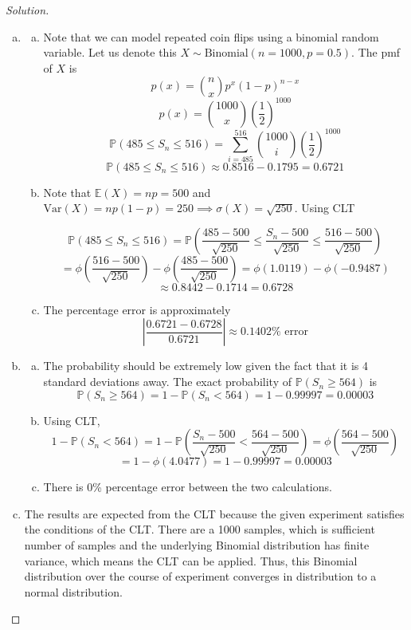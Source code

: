 \documentclass[12pt]{scrartcl}
\newcommand{\E}{\mathbb{E}}
\newcommand{\PP}{\mathbb{P}}
\newcommand{\V}{\text{Var}}
\begin{document}
\begin{proof}[Solution]
  
\hfill

\begin{enumerate}[a.]
  \item \begin{enumerate}[a.]

    \item Note that we can model repeated coin flips using a binomial random variable. Let 
    us denote this $X \sim \text{Binomial}(n=1000, p=0.5)$. The pmf of $X$ is 
    \[p(x) = \binom{n}{x}p^x(1-p)^{n-x}\]
    \[p(x) = \binom{1000}{x}(\frac{1}{2})^{1000}\]
    \[\PP(485 \leq S_n \leq 516) = \sum_{i=485}^{516} \binom{1000}{i}(\frac{1}{2})^{1000}\]
    \[\PP(485 \leq S_n \leq 516) \approx 0.8516 - 0.1795 = 0.6721\]

    \item Note that $\E(X) = np = 500$ and $\V(X) = np(1-p) = 250 \implies \sigma(X) = \sqrt{250}$. Using CLT
    
    \[\PP(485 \leq S_n \leq 516) = \PP(\frac{485 - 500}{\sqrt{250}} \leq \frac{S_n - 500}{\sqrt{250}} \leq \frac{516 - 500}{\sqrt{250}})\]
    \[= \phi(\frac{516 - 500}{\sqrt{250}}) - \phi(\frac{485 - 500}{\sqrt{250}}) = \phi(1.0119) - \phi(-0.9487)\]
    \[\approx 0.8442 - 0.1714 = 0.6728\]

    \item The percentage error is approximately 
    \[|\frac{0.6721 - 0.6728}{0.6721}| \approx 0.1402\% \text{ error}\]

  \end{enumerate}

  \item \begin{enumerate}[a.]
    \item The probability should be extremely low 
    given the fact that it is 4 standard deviations away. The exact probability of $\PP(S_n \geq 564)$ is 
    \[\PP(S_n \geq 564) = 1 - \PP(S_n < 564) = 1 - 0.99997 = 0.00003\]

    \item Using CLT, 
    \[1 - \PP(S_n < 564) = 1 - \PP(\frac{S_n - 500}{\sqrt{250}} < \frac{564 - 500}{\sqrt{250}}) = \phi(\frac{564 - 500}{\sqrt{250}})\]
    \[ = 1 - \phi(4.0477) = 1 - 0.99997 = 0.00003\]
    \item There is 0\% percentage error between the two calculations.
  \end{enumerate}

  \item The results are expected from the CLT because the given experiment satisfies the conditions of the CLT. 
  There are a 1000 samples, which is sufficient number of samples and the underlying Binomial distribution 
  has finite variance, which means the CLT can be applied. Thus, this Binomial distribution over the course of experiment 
  converges in distribution to a normal distribution.
\end{enumerate}

\end{proof}
\end{document}
